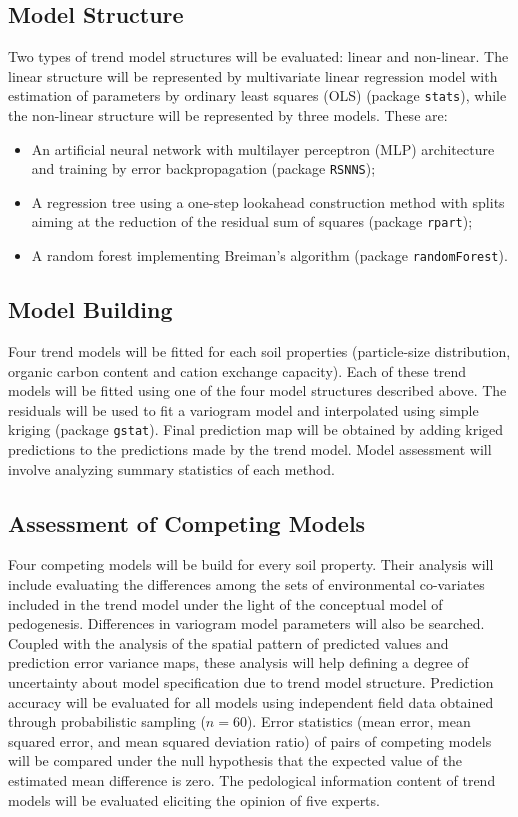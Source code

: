 \subsection{Model Structure}

Two types of trend model structures will be evaluated: linear and non-linear. The linear structure will be represented by multivariate linear regression model with estimation of parameters by ordinary least squares (OLS) (package \texttt{stats}), while the non-linear structure will be represented by three models. These are:

\begin{itemize}
\item An artificial neural network with multilayer perceptron (MLP) architecture and training by error backpropagation (package \texttt{RSNNS});
\item A regression tree using a one-step lookahead construction method with splits aiming at the reduction of the residual sum of squares (package \texttt{rpart});
\item A random forest implementing Breiman's algorithm (package \texttt{randomForest}).
\end{itemize}

\subsection{Model Building}

Four trend models will be fitted for each soil properties (particle-size distribution, organic carbon content and cation exchange capacity). Each of these trend models will be fitted using one of the four model structures described above. The residuals will be used to fit a variogram model and interpolated using simple kriging (package \texttt{gstat}). Final prediction map will be obtained by adding kriged predictions to the predictions made by the trend model. Model assessment will involve analyzing summary statistics of each method.

\subsection{Assessment of Competing Models}

Four competing models will be build for every soil property. Their analysis will include evaluating the differences among the sets of environmental co-variates included in the trend model under the light of the conceptual model of pedogenesis. Differences in variogram model parameters will also be searched. Coupled with the analysis of the spatial pattern of predicted values and prediction error variance maps, these analysis will help defining a degree of uncertainty about model specification due to trend model structure. Prediction accuracy  will be evaluated for all models using independent field data obtained through probabilistic sampling ($n=60$). Error statistics (mean error, mean squared error, and mean squared deviation ratio) of pairs of competing models will be compared under the null hypothesis that the expected value of the estimated mean difference is zero. The pedological information content of trend models will be evaluated eliciting the opinion of five experts.